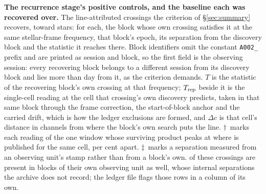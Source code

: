 \begin{table}
\centering
\caption{\textbf{The recurrence stage's positive controls, and the baseline
each was recovered over.} The \QcNCtl{} line-attributed crossings the
criterion of \S\ref{sec:summary} recovers, toward \QcNStar{} stars: for each,
the block whose own crossing satisfies it at the same stellar-frame
frequency, that block's epoch, its separation from the discovery block and
the statistic it reaches there. Block identifiers omit the constant
\texttt{A002\_} prefix and are printed as session and block, so the first
field is the observing session: every recovering block belongs to a different
session from its discovery block and lies more than \EpSep{} day from it, as
the criterion demands. $T$ is the statistic of the
recovering block's own crossing at that frequency; $T_{\rm rep}$ beside it is
the single-cell reading at the cell that crossing's own discovery predicts,
taken in that same block through the frame correction, the start-of-block
anchor and the carried drift, which is how the \RcNExcl{} ledger exclusions
are formed, and $\Delta c$ is that cell's distance in channels from where the
block's own search puts the line.
$\dagger$~marks each reading of the one window whose surviving product peaks
at \LrSuppOwn{} where \LrSuppPub{} is published for the same cell,
\LrSuppPct{} per cent apart. $\ddagger$~marks a separation measured
from an observing unit's stamp rather than from a block's own.
\QcNUnrecWord{} of these crossings are present in blocks of their own
observing unit as well, whose internal separations the archive does not
record; the ledger file flags those rows in a column of its own.}
\label{tab:confirm}
\small

\end{table}
